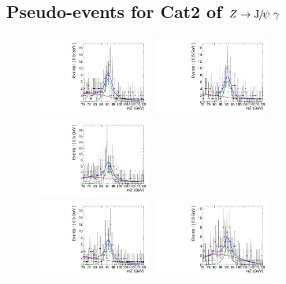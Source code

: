\subsection{Pseudo-events for Cat2 of $Z\to {\mathrm{J}\hspace{-.08em}/\hspace{-.14em}\psi}\ \gamma$}
\begin{figure}[!ht]
  \centering
  \includegraphics[width=0.33\textwidth]{Fig/BiasStudy/Toys/ZJpsiG_Cat2/TruePdf2_FitPdf2_mu200_sbfit_12324_cat2}~
  \includegraphics[width=0.33\textwidth]{Fig/BiasStudy/Toys/ZJpsiG_Cat2/TruePdf2_FitPdf2_mu200_sbfit_12315_cat2}~
  \includegraphics[width=0.33\textwidth]{Fig/BiasStudy/Toys/ZJpsiG_Cat2/TruePdf2_FitPdf2_mu200_sbfit_1234_cat2}\\
  \includegraphics[width=0.33\textwidth]{Fig/BiasStudy/Toys/ZJpsiG_Cat2/TruePdf2_FitPdf2_mu200_sbfit_12331_cat2}~
  \includegraphics[width=0.33\textwidth]{Fig/BiasStudy/Toys/ZJpsiG_Cat2/TruePdf2_FitPdf2_mu200_sbfit_12313_cat2}~

\end{figure}
